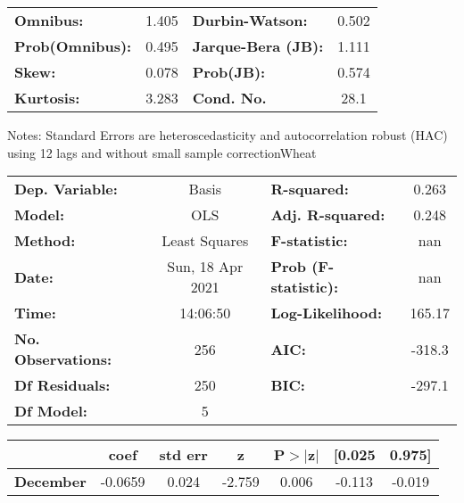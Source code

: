 \begin{center}
\begin{tabular}{lcccccc}
\bottomrule
\end{tabular}
\begin{tabular}{lclc}
\textbf{Omnibus:}       &  1.405 & \textbf{  Durbin-Watson:     } &    0.502  \\
\textbf{Prob(Omnibus):} &  0.495 & \textbf{  Jarque-Bera (JB):  } &    1.111  \\
\textbf{Skew:}          &  0.078 & \textbf{  Prob(JB):          } &    0.574  \\
\textbf{Kurtosis:}      &  3.283 & \textbf{  Cond. No.          } &     28.1  \\
\bottomrule
\end{tabular}
\end{center}

Notes: \newline
 [1] Standard Errors are heteroscedasticity and autocorrelation robust (HAC) using 12 lags and without small sample correctionWheat\begin{center}
\begin{tabular}{lclc}
\toprule
\textbf{Dep. Variable:}    &      Basis       & \textbf{  R-squared:         } &     0.263   \\
\textbf{Model:}            &       OLS        & \textbf{  Adj. R-squared:    } &     0.248   \\
\textbf{Method:}           &  Least Squares   & \textbf{  F-statistic:       } &       nan   \\
\textbf{Date:}             & Sun, 18 Apr 2021 & \textbf{  Prob (F-statistic):} &      nan    \\
\textbf{Time:}             &     14:06:50     & \textbf{  Log-Likelihood:    } &    165.17   \\
\textbf{No. Observations:} &         256      & \textbf{  AIC:               } &    -318.3   \\
\textbf{Df Residuals:}     &         250      & \textbf{  BIC:               } &    -297.1   \\
\textbf{Df Model:}         &           5      & \textbf{                     } &             \\
\bottomrule
\end{tabular}
\begin{tabular}{lcccccc}
                   & \textbf{coef} & \textbf{std err} & \textbf{z} & \textbf{P$> |$z$|$} & \textbf{[0.025} & \textbf{0.975]}  \\
\midrule
\textbf{December}  &      -0.0659  &        0.024     &    -2.759  &         0.006        &       -0.113    &       -0.019     \\

\end{tabular}
\end{center}
